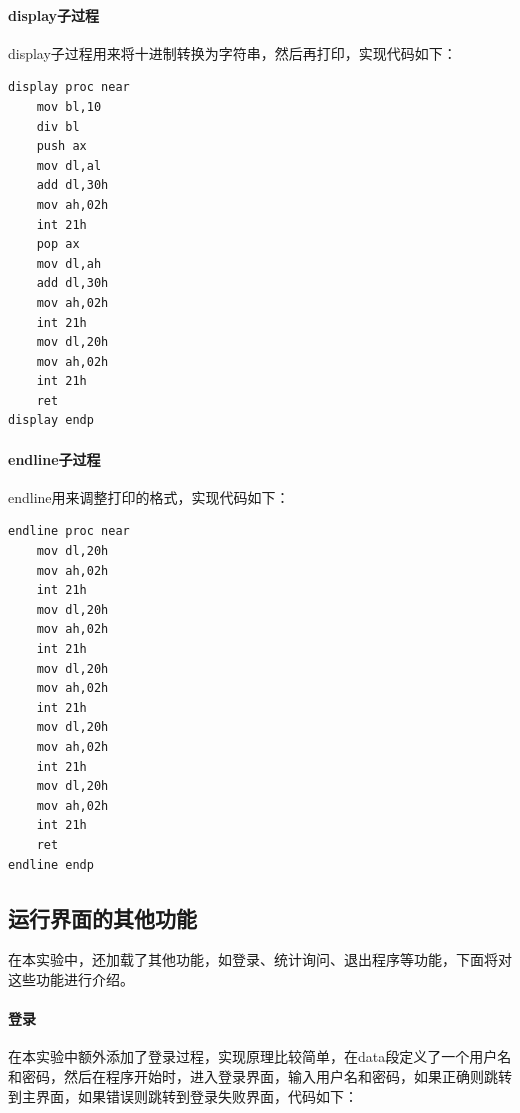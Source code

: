 \documentclass[UTF8,12pt]{article}
\begin{document}
\paragraph{display子过程}
display子过程用来将十进制转换为字符串，然后再打印，实现代码如下：

\begin{lstlisting}[title=display子过程,frame=shadowbox]
display proc near
    mov bl,10
    div bl
    push ax
    mov dl,al
    add dl,30h
    mov ah,02h
    int 21h
    pop ax
    mov dl,ah
    add dl,30h
    mov ah,02h
    int 21h
    mov dl,20h
    mov ah,02h
    int 21h
    ret
display endp
\end{lstlisting}

\paragraph{endline子过程}
endline用来调整打印的格式，实现代码如下：

\begin{lstlisting}[title=endline子过程,frame=shadowbox]
    endline proc near
    mov dl,20h
    mov ah,02h
    int 21h
    mov dl,20h
    mov ah,02h
    int 21h
    mov dl,20h
    mov ah,02h
    int 21h
    mov dl,20h
    mov ah,02h
    int 21h
    mov dl,20h
    mov ah,02h
    int 21h
    ret
endline endp
\end{lstlisting}

\subsection{运行界面的其他功能}
在本实验中，还加载了其他功能，如登录、统计询问、退出程序等功能，下面将对这些功能进行介绍。

\paragraph{登录}
在本实验中额外添加了登录过程，实现原理比较简单，在data段定义了一个用户名和密码，然后在程序开始时，进入登录界面，输入用户名和密码，如果正确则跳转到主界面，如果错误则跳转到登录失败界面，代码如下：
\end{document}
